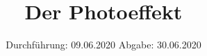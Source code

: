 

\subject{V500}
\title{Der Photoeffekt}
\date{%
  Durchführung: 09.06.2020
  \hspace{3em}
  Abgabe: 30.06.2020
}



\maketitle
\thispagestyle{empty}
\tableofcontents
\newpage







\printbibliography{}


